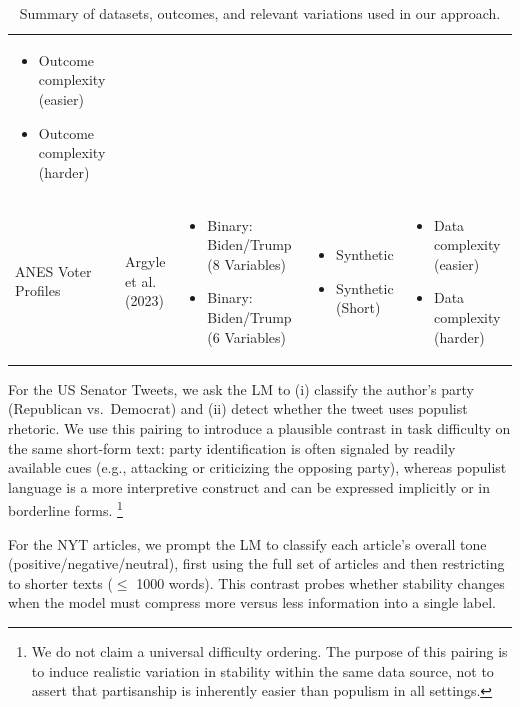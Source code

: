 \documentclass{article}
\begin{document}
\begin{landscape}
\begin{table}[htbp]
\begin{tabular}{p{2cm}p{2cm}p{6cm}p{4cm}p{4cm}}
\begin{itemize}[nosep,leftmargin=*]
            \item Outcome complexity (easier)
            \item Outcome complexity (harder)
        \end{itemize} \\
        \addlinespace[0.5em]
        ANES Voter Profiles & Argyle et al. (2023) & \begin{itemize}[nosep,leftmargin=*]
            \item Binary: Biden/Trump (8 Variables)
            \item Binary: Biden/Trump (6 Variables)
        \end{itemize} & \begin{itemize}[nosep,leftmargin=*]
            \item Synthetic
            \item Synthetic (Short)
        \end{itemize} & \begin{itemize}[nosep,leftmargin=*]
            \item Data complexity (easier)
            \item Data complexity (harder)
        \end{itemize} \\
        \bottomrule
    \end{tabular}
    \caption{Summary of datasets, outcomes, and relevant variations used in our approach.}
    \label{tab:datasets}
\end{table}
\end{landscape}

For the US Senator Tweets, we ask the LM to (i) classify the author’s party (Republican vs.\ Democrat) and (ii) detect whether the tweet uses populist rhetoric. We use this pairing to introduce a plausible contrast in task difficulty on the same short-form text: party identification is often signaled by readily available cues (e.g., attacking or criticizing the opposing party), whereas populist language is a more interpretive construct and can be expressed implicitly or in borderline forms. \footnote{We do not claim a universal difficulty ordering. The purpose of this pairing is to induce realistic variation in stability within the same data source, not to assert that partisanship is inherently easier than populism in all settings.}

For the NYT articles, we prompt the LM to classify each article’s overall tone (positive/negative/neutral), first using the full set of articles and then restricting to shorter texts ($\leq$ 1000 words). This contrast probes whether stability changes when the model must compress more versus less information into a single label.
\end{document}
